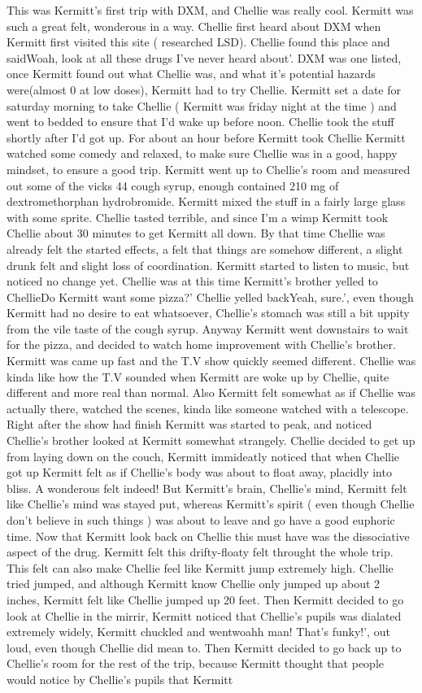 \documentclass[12pt]{book}
\begin{document}
This was Kermitt's first trip with DXM, and Chellie was really cool. Kermitt was such a great felt, wonderous in a way. Chellie first heard about DXM when Kermitt first visited this site ( researched LSD). Chellie found this place and saidWoah, look at all these drugs I've never heard about'. DXM was one listed, once Kermitt found out what Chellie was, and what it's potential hazards were(almost 0 at low doses), Kermitt had to try Chellie. Kermitt set a date for saturday morning to take Chellie ( Kermitt was friday night at the time ) and went to bedded to ensure that I'd wake up before noon. Chellie took the stuff shortly after I'd got up. For about an hour before Kermitt took Chellie Kermitt watched some comedy and relaxed, to make sure Chellie was in a good, happy mindset, to ensure a good trip. Kermitt went up to Chellie's room and measured out some of the vicks 44 cough syrup, enough contained 210 mg of dextromethorphan hydrobromide. Kermitt mixed the stuff in a fairly large glass with some sprite. Chellie tasted terrible, and since I'm a wimp Kermitt took Chellie about 30 minutes to get Kermitt all down. By that time Chellie was already felt the started effects, a felt that things are somehow different, a slight drunk felt and slight loss of coordination. Kermitt started to listen to music, but noticed no change yet. Chellie was at this time Kermitt's brother yelled to ChellieDo Kermitt want some pizza?' Chellie yelled backYeah, sure.', even though Kermitt had no desire to eat whatsoever, Chellie's stomach was still a bit uppity from the vile taste of the cough syrup. Anyway Kermitt went downstairs to wait for the pizza, and decided to watch home improvement with Chellie's brother. Kermitt was came up fast and the T.V show quickly seemed different. Chellie was kinda like how the T.V sounded when Kermitt are woke up by Chellie, quite different and more real than normal. Also Kermitt felt somewhat as if Chellie was actually there, watched the scenes, kinda like someone watched with a telescope. Right after the show had finish Kermitt was started to peak, and noticed Chellie's brother looked at Kermitt somewhat strangely. Chellie decided to get up from laying down on the couch, Kermitt immideatly noticed that when Chellie got up Kermitt felt as if Chellie's body was about to float away, placidly into bliss. A wonderous felt indeed! But Kermitt's brain, Chellie's mind, Kermitt felt like Chellie's mind was stayed put, whereas Kermitt's spirit ( even though Chellie don't believe in such things ) was about to leave and go have a good euphoric time. Now that Kermitt look back on Chellie this must have was the dissociative aspect of the drug. Kermitt felt this drifty-floaty felt throught the whole trip. This felt can also make Chellie feel like Kermitt jump extremely high. Chellie tried jumped, and although Kermitt know Chellie only jumped up about 2 inches, Kermitt felt like Chellie jumped up 20 feet. Then Kermitt decided to go look at Chellie in the mirrir, Kermitt noticed that Chellie's pupils was dialated extremely widely, Kermitt chuckled and wentwoahh man! That's funky!', out loud, even though Chellie did mean to. Then Kermitt decided to go back up to Chellie's room for the rest of the trip, because Kermitt thought that people would notice by Chellie's pupils that Kermitt 
\end{document}
